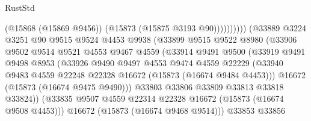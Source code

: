 \begin{lexlean}{RustStd}
\begin{coremodule}
                                          (@15868 (@15869 @9456))
                                          (@15873 (@15875 @3193 @90))))))))))
                          (@33889
                            @3224
                            @3251
                            @90
                            @9515
                            @9524
                            @4453
                            @9938
                            (@33899
                              @9515
                              @9522
                              @8980
                              (@33906
                                @9502
                                @9514
                                @9521
                                @4553
                                @9467
                                @4559
                                (@33914
                                  @9491
                                  @9500
                                  (@33919
                                    @9491
                                    @9498
                                    @8953
                                    (@33926
                                      @9490
                                      @9497
                                      @4553
                                      @9474
                                      @4559
                                      @22229
                                      (@33940
                                        @9483
                                        @4559
                                        @22248
                                        @22328
                                        @16672
                                        (@15873 (@16674 @9484 @4453)))
                                      @16672
                                      (@15873 (@16674 @9475 @9490)))
                                    @33803
                                    @33806
                                    @33809
                                    @33813
                                    @33818
                                    @33824))
                                (@33835
                                  @9507
                                  @4559
                                  @22314
                                  @22328
                                  @16672
                                  (@15873 (@16674 @9508 @4453)))
                                @16672
                                (@15873 (@16674 @9468 @9514)))
                              @33853
                              @33856

\end{coremodule}
\end{lexlean}
